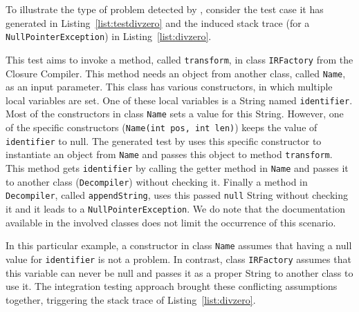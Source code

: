 %

To illustrate the type of problem detected by \integration, consider the test case it has generated in Listing~\ref{list:testdivzero} and the induced stack trace (for a \texttt{NullPointerException}) in Listing~\ref{list:divzero}.

This test aims to invoke a method, called \texttt{transform}, in class \texttt{IRFactory} from the Closure Compiler. This method needs an object from another class, called \texttt{Name}, as an input parameter. This class has various constructors, in which multiple local variables are set. One of these local variables is a String named \texttt{identifier}. Most of the constructors in class \texttt{Name} sets a value for this String. However, one of the specific constructors (\texttt{Name(int pos, int len)}) keeps the value of \texttt{identifier} to null. The generated test by \cling uses this specific constructor to instantiate an object from \texttt{Name} and passes this object to method \texttt{transform}. This method gets \texttt{identifier} by calling the getter method in \texttt{Name} and passes it to another class (\texttt{Decompiler}) without checking it. 
Finally a method in \texttt{Decompiler}, called \texttt{appendString}, uses this passed \texttt{null} String without checking it and it leads to a \texttt{NullPointerException}. We do note that the documentation available in the involved classes does not limit the occurrence of this scenario.

In this particular example, a constructor in class \texttt{Name} assumes that having a null value for \texttt{identifier} is not a problem. In contrast, class \texttt{IRFactory} assumes that this variable can never be null and passes it as a proper String to another class to use it.
The \integration integration testing approach brought these conflicting assumptions together, triggering the stack trace of Listing~\ref{list:divzero}.



